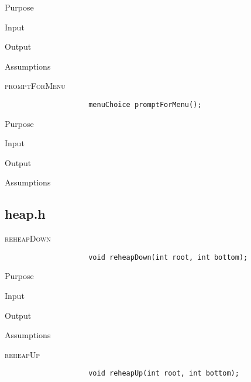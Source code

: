 \documentclass[pdftex, 12pt]{article}
\begin{document}
\begin{description}
\begin{description}
\begin{description}
\begin{description}
					\item{Purpose}

					\item{Input}

					\item{Output}

					\item{Assumptions}

				\end{description}
			\item{\textsc{promptForMenu}}
				\begin{lstlisting}
					menuChoice promptForMenu();
				\end{lstlisting}
				\begin{description}

					\item{Purpose}

					\item{Input}

					\item{Output}

					\item{Assumptions}

				\end{description}
		\end{description}
		\subsection{heap.h}
		\begin{description}

			\item{\textsc{reheapDown}}
				\begin{lstlisting}
					void reheapDown(int root, int bottom);
				\end{lstlisting}
				\begin{description}

					\item{Purpose}

					\item{Input}

					\item{Output}

					\item{Assumptions}

				\end{description}
			\item{\textsc{reheapUp}}
				\begin{lstlisting}
					void reheapUp(int root, int bottom);
				\end{lstlisting}
				\begin{description}


\end{description}
\end{description}
\end{description}
\end{description}
\end{document}
